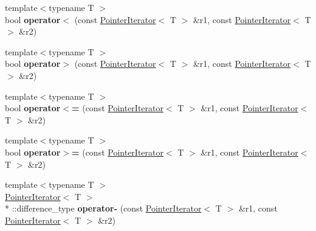\begin{DoxyCompactItemize}
\item 
\hypertarget{namespacekeycpp_a689a724b505d52660e42e1148eba1a9a}{{\footnotesize template$<$typename T $>$ }\\bool {\bfseries operator$<$} (const \hyperlink{classkeycpp_1_1_pointer_iterator}{Pointer\-Iterator}$<$ T $>$ \&r1, const \hyperlink{classkeycpp_1_1_pointer_iterator}{Pointer\-Iterator}$<$ T $>$ \&r2)}\label{namespacekeycpp_a689a724b505d52660e42e1148eba1a9a}

\item 
\hypertarget{namespacekeycpp_a7330eaaa701d2308c19f84adda097685}{{\footnotesize template$<$typename T $>$ }\\bool {\bfseries operator$>$} (const \hyperlink{classkeycpp_1_1_pointer_iterator}{Pointer\-Iterator}$<$ T $>$ \&r1, const \hyperlink{classkeycpp_1_1_pointer_iterator}{Pointer\-Iterator}$<$ T $>$ \&r2)}\label{namespacekeycpp_a7330eaaa701d2308c19f84adda097685}

\item 
\hypertarget{namespacekeycpp_a9b02f40e92cad47b419ac09207518b9f}{{\footnotesize template$<$typename T $>$ }\\bool {\bfseries operator$<$=} (const \hyperlink{classkeycpp_1_1_pointer_iterator}{Pointer\-Iterator}$<$ T $>$ \&r1, const \hyperlink{classkeycpp_1_1_pointer_iterator}{Pointer\-Iterator}$<$ T $>$ \&r2)}\label{namespacekeycpp_a9b02f40e92cad47b419ac09207518b9f}

\item 
\hypertarget{namespacekeycpp_af6e928cddf953cbdd90b0cd6f3802b24}{{\footnotesize template$<$typename T $>$ }\\bool {\bfseries operator$>$=} (const \hyperlink{classkeycpp_1_1_pointer_iterator}{Pointer\-Iterator}$<$ T $>$ \&r1, const \hyperlink{classkeycpp_1_1_pointer_iterator}{Pointer\-Iterator}$<$ T $>$ \&r2)}\label{namespacekeycpp_af6e928cddf953cbdd90b0cd6f3802b24}

\item 
\hypertarget{namespacekeycpp_ad88546738baf0a658bbe540827343939}{{\footnotesize template$<$typename T $>$ }\\\hyperlink{classkeycpp_1_1_pointer_iterator}{Pointer\-Iterator}$<$ T $>$\\*
\-::difference\-\_\-type {\bfseries operator-\/} (const \hyperlink{classkeycpp_1_1_pointer_iterator}{Pointer\-Iterator}$<$ T $>$ \&r1, const \hyperlink{classkeycpp_1_1_pointer_iterator}{Pointer\-Iterator}$<$ T $>$ \&r2)}\label{namespacekeycpp_ad88546738baf0a658bbe540827343939}

\end{DoxyCompactItemize}


